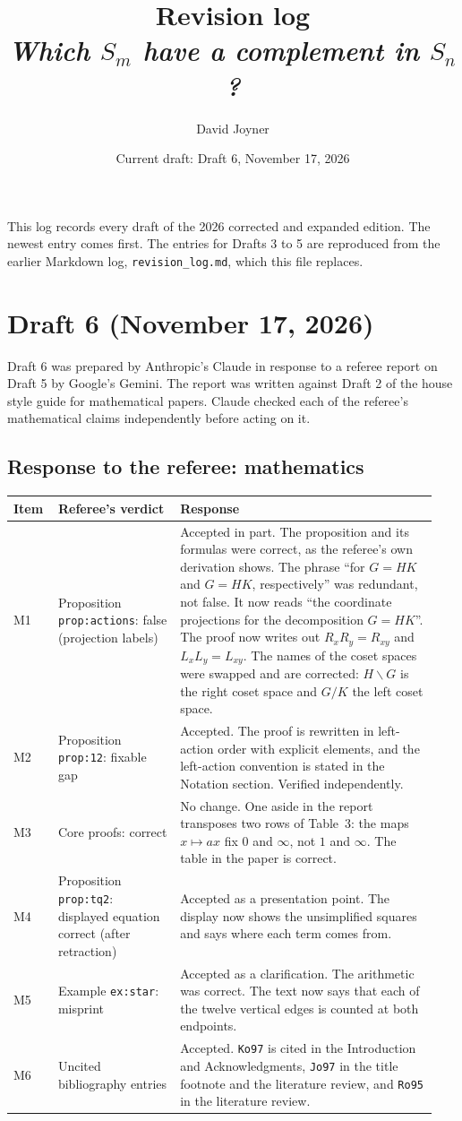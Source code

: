 \documentclass[12pt,letterpaper]{article}
\title{Revision log\\\large \emph{Which $S_m$ have a complement in $S_n$?}}
\author{David Joyner}
\date{Current draft: Draft 6, November 17, 2026}
\begin{document}
\maketitle

This log records every draft of the 2026 corrected and expanded edition. The newest entry comes first. The entries for Drafts 3 to 5 are reproduced from the earlier Markdown log, \texttt{revision\_log.md}, which this file replaces.

\tableofcontents

\section{Draft 6 (November 17, 2026)}
Draft 6 was prepared by Anthropic's Claude in response to a referee report on Draft 5 by Google's Gemini. The report was written against Draft 2 of the house style guide for mathematical papers. Claude checked each of the referee's mathematical claims independently before acting on it.

\subsection{Response to the referee: mathematics}
\begin{longtable}{@{}p{0.09\linewidth}p{0.27\linewidth}p{0.58\linewidth}@{}}\toprule
Item & Referee's verdict & Response\\\midrule\endhead
M1 & Proposition \texttt{prop:actions}: false (projection labels) & Accepted in part. The proposition and its formulas were correct, as the referee's own derivation shows. The phrase ``for $G=HK$ and $G=HK$, respectively'' was redundant, not false. It now reads ``the coordinate projections for the decomposition $G=HK$''. The proof now writes out $R_xR_y=R_{xy}$ and $L_xL_y=L_{xy}$. The names of the coset spaces were swapped and are corrected: $H\backslash G$ is the right coset space and $G/K$ the left coset space.\\
M2 & Proposition \texttt{prop:12}: fixable gap & Accepted. The proof is rewritten in left-action order with explicit elements, and the left-action convention is stated in the Notation section. Verified independently.\\
M3 & Core proofs: correct & No change. One aside in the report transposes two rows of Table~3: the maps $x\mapsto ax$ fix $0$ and $\infty$, not $1$ and $\infty$. The table in the paper is correct.\\
M4 & Proposition \texttt{prop:tq2}: displayed equation correct (after retraction) & Accepted as a presentation point. The display now shows the unsimplified squares and says where each term comes from.\\
M5 & Example \texttt{ex:star}: misprint & Accepted as a clarification. The arithmetic was correct. The text now says that each of the twelve vertical edges is counted at both endpoints.\\
M6 & Uncited bibliography entries & Accepted. \texttt{Ko97} is cited in the Introduction and Acknowledgments, \texttt{Jo97} in the title footnote and the literature review, and \texttt{Ro95} in the literature review.\\
\bottomrule
\end{longtable}
\end{document}
